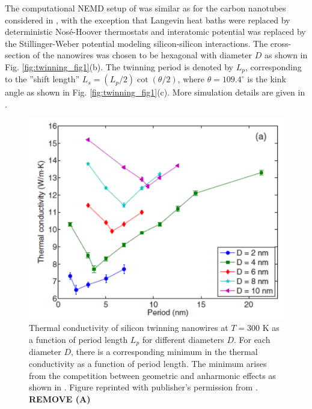 

The computational NEMD setup of  was similar as for the carbon nanotubes considered in , with the exception that Langevin heat baths were replaced by deterministic Nos\'e-Hoover thermostats \cite{nose84} and interatomic potential was replaced by the Stillinger-Weber potential \cite{stillinger85} modeling silicon-silicon interactions. The cross-section of the nanowires was chosen to be hexagonal with diameter $D$ as shown in Fig. \ref{fig:twinning_fig1}(b). The twinning period is denoted by $L_p$, corresponding to the ''shift length'' $L_s=(L_p/2)\cot(\theta/2)$, where $\theta=109.4^{\circ}$ is the kink angle as shown in Fig. \ref{fig:twinning_fig1}(c). More simulation details are given in .


\begin{figure}[tb]
 \begin{center}
  \includegraphics[width=.89\columnwidth]{pics/twinning_fig2a.pdf} 
  \caption{Thermal conductivity of silicon twinning nanowires at $T=300$ K as a function of period length $L_p$ for different diameters $D$. For each diameter $D$, there is a corresponding minimum in the thermal conductivity as a function of period length. The minimum arises from the competition between geometric and anharmonic effects as shown in . Figure reprinted with publisher's permission from . \textbf{REMOVE (A)}}  
\label{fig:twinning_fig2}
 \end{center}
\end{figure}

